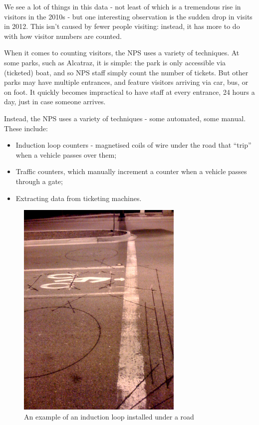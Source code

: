 \documentclass[
  letterpaper,
  DIV=11,
  numbers=noendperiod]{scrartcl}
\providecommand{\tightlist}{%
  \setlength{\itemsep}{0pt}\setlength{\parskip}{0pt}}\usepackage{longtable,booktabs,array}
\begin{document}
We see a lot of things in this data - not least of which is a tremendous
rise in visitors in the 2010s - but one interesting observation is the
sudden drop in visits in 2012. This isn't caused by fewer people
visiting: instead, it has more to do with how visitor numbers are
counted.

When it comes to counting visitors, the NPS uses a variety of
techniques. At some parks, such as Alcatraz, it is simple: the park is
only accessible via (ticketed) boat, and so NPS staff simply count the
number of tickets. But other parks may have multiple entrances, and
feature visitors arriving via car, bus, or on foot. It quickly becomes
impractical to have staff at every entrance, 24 hours a day, just in
case someone arrives.

Instead, the NPS uses a variety of techniques - some automated, some
manual. These include:

\begin{itemize}
\tightlist
\item
  Induction loop counters - magnetised coils of wire under the road that
  ``trip'' when a vehicle passes over them;
\item
  Traffic counters, which manually increment a counter when a vehicle
  passes through a gate;
\item
  Extracting data from ticketing machines.
\end{itemize}

\begin{figure}[H]

{\centering \includegraphics[width=3.125in,height=\textheight]{index_files/mediabag/Inductance_detectors.jpg}

}

\caption{An example of an induction loop installed under a road}

\end{figure}%
\end{document}
